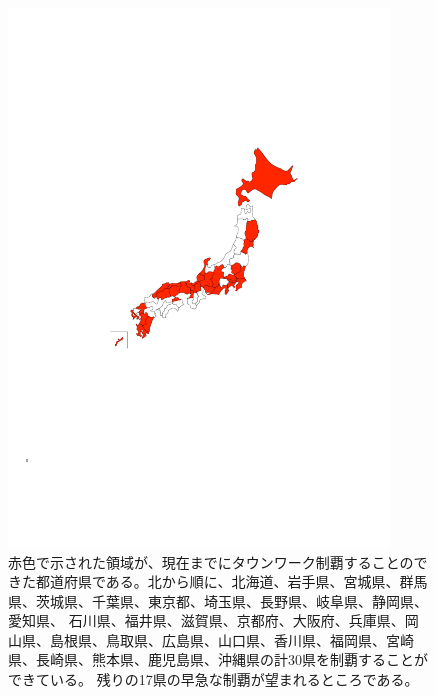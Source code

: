 \begin{figure}
  \centering
  \includegraphics[width=0.9\textwidth]{./section/TownWork/figures/JapanMap.pdf}
  \caption{赤色で示された領域が、現在までにタウンワーク制覇することのできた都道府県である。北から順に、北海道、岩手県、宮城県、群馬県、茨城県、千葉県、東京都、埼玉県、長野県、岐阜県、静岡県、愛知県、
  石川県、福井県、滋賀県、京都府、大阪府、兵庫県、岡山県、島根県、鳥取県、広島県、山口県、香川県、福岡県、宮崎県、長崎県、熊本県、鹿児島県、沖縄県の計30県を制覇することができている。
  残りの17県の早急な制覇が望まれるところである。}
  \label{fig:JapanMap}
\end{figure}


